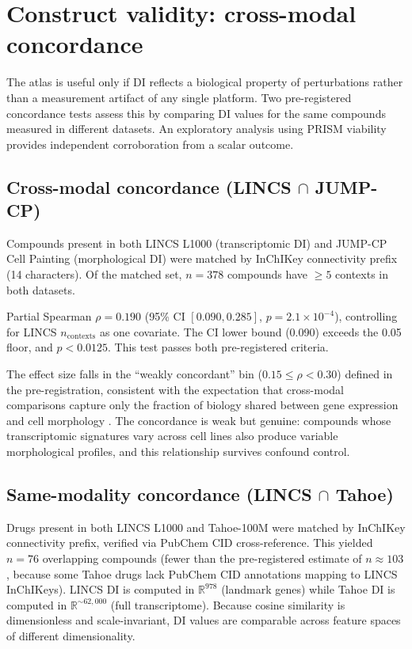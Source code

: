 \documentclass[11pt]{article}
\begin{document}
\section{Construct validity: cross-modal concordance}
\label{sec:concordance}

The atlas is useful only if DI reflects a biological property of
perturbations rather than a measurement artifact of any single platform.
Two pre-registered concordance tests assess this by comparing
DI values for the same compounds measured in different datasets.  An
exploratory analysis using PRISM viability provides independent
corroboration from a scalar outcome.

\subsection{Cross-modal concordance (LINCS \texorpdfstring{$\cap$}{∩} JUMP-CP)}

Compounds present in both LINCS L1000 (transcriptomic DI) and JUMP-CP
Cell Painting (morphological DI) were matched by InChIKey connectivity
prefix (14 characters).  Of the matched set, $n = 378$ compounds have
$\geq 5$ contexts in both datasets.

Partial Spearman $\rho = 0.190$ (95\% CI $[0.090, 0.285]$,
$p = 2.1 \times 10^{-4}$), controlling for LINCS $n_{\mathrm{contexts}}$
as one covariate.  The CI lower bound (0.090) exceeds the 0.05 floor,
and $p < 0.0125$.  This test passes both pre-registered criteria.

The effect size falls in the ``weakly concordant'' bin
($0.15 \leq \rho < 0.30$) defined in the pre-registration, consistent
with the expectation that cross-modal comparisons capture only the
fraction of biology shared between gene expression and cell morphology
\citep{haghighi2022crossmodal}.  The concordance is weak but genuine:
compounds whose transcriptomic signatures vary across cell lines also
produce variable morphological profiles, and this relationship survives
confound control.

\subsection{Same-modality concordance (LINCS \texorpdfstring{$\cap$}{∩} Tahoe)}

Drugs present in both LINCS L1000 and Tahoe-100M were matched by
InChIKey connectivity prefix, verified via PubChem CID cross-reference.
This yielded $n = 76$ overlapping compounds (fewer than the
pre-registered estimate of $n \approx 103$, because some Tahoe drugs
lack PubChem CID annotations mapping to LINCS InChIKeys).  LINCS DI is
computed in $\mathbb{R}^{978}$ (landmark genes) while Tahoe DI is
computed in $\mathbb{R}^{\sim 62{,}000}$ (full transcriptome).  Because
cosine similarity is dimensionless and scale-invariant, DI values are
comparable across feature spaces of different dimensionality.
\end{document}

